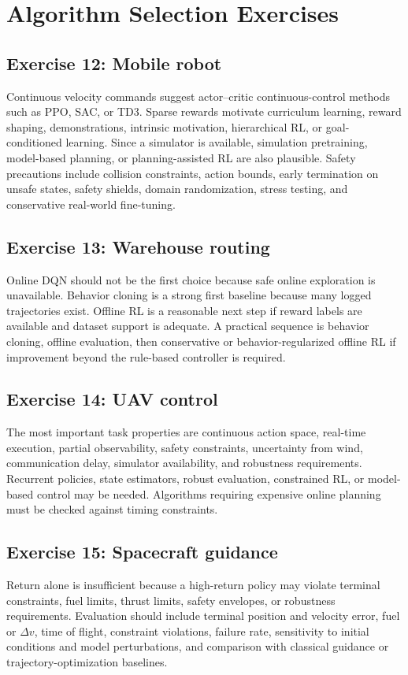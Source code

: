 \section*{Algorithm Selection Exercises}

\subsection*{Exercise 12: Mobile robot}
Continuous velocity commands suggest actor--critic continuous-control methods such as PPO, SAC, or TD3. Sparse rewards motivate curriculum learning, reward shaping, demonstrations, intrinsic motivation, hierarchical RL, or goal-conditioned learning. Since a simulator is available, simulation pretraining, model-based planning, or planning-assisted RL are also plausible. Safety precautions include collision constraints, action bounds, early termination on unsafe states, safety shields, domain randomization, stress testing, and conservative real-world fine-tuning.

\subsection*{Exercise 13: Warehouse routing}
Online DQN should not be the first choice because safe online exploration is unavailable. Behavior cloning is a strong first baseline because many logged trajectories exist. Offline RL is a reasonable next step if reward labels are available and dataset support is adequate. A practical sequence is behavior cloning, offline evaluation, then conservative or behavior-regularized offline RL if improvement beyond the rule-based controller is required.

\subsection*{Exercise 14: UAV control}
The most important task properties are continuous action space, real-time execution, partial observability, safety constraints, uncertainty from wind, communication delay, simulator availability, and robustness requirements. Recurrent policies, state estimators, robust evaluation, constrained RL, or model-based control may be needed. Algorithms requiring expensive online planning must be checked against timing constraints.

\subsection*{Exercise 15: Spacecraft guidance}
Return alone is insufficient because a high-return policy may violate terminal constraints, fuel limits, thrust limits, safety envelopes, or robustness requirements. Evaluation should include terminal position and velocity error, fuel or $\Delta v$, time of flight, constraint violations, failure rate, sensitivity to initial conditions and model perturbations, and comparison with classical guidance or trajectory-optimization baselines.

